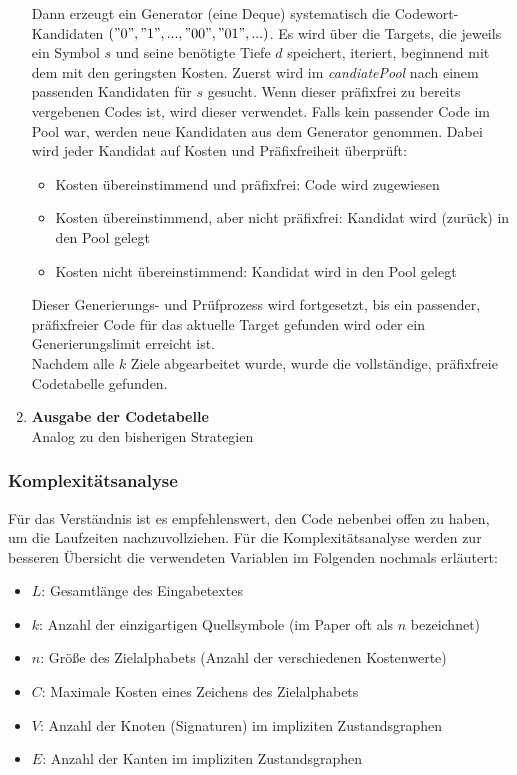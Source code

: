 \documentclass[a4paper,10pt,ngerman]{scrartcl}
\begin{document}
\begin{enumerate}
  Dann erzeugt ein Generator (eine Deque) systematisch die Codewort-Kandidaten $("0", "1", ..., "00",\\ "01", ...)$. Es wird über die Targets, die jeweils ein Symbol $s$ und seine benötigte Tiefe $d$ speichert, iteriert, beginnend mit dem mit den geringsten Kosten. Zuerst wird im \textit{candiatePool} nach einem passenden Kandidaten für $s$ gesucht. Wenn dieser präfixfrei zu bereits vergebenen Codes ist, wird dieser verwendet. Falls kein passender Code im Pool war, werden neue Kandidaten aus dem Generator genommen. Dabei wird jeder Kandidat auf Kosten und Präfixfreiheit überprüft: 
  \begin{itemize}
    \item Kosten übereinstimmend und präfixfrei: Code wird zugewiesen 
    \item Kosten übereinstimmend, aber nicht präfixfrei: Kandidat wird (zurück) in den Pool gelegt 
    \item Kosten nicht übereinstimmend: Kandidat wird in den Pool gelegt 
  \end{itemize}
  Dieser Generierungs- und Prüfprozess wird fortgesetzt, bis ein passender, präfixfreier Code für das aktuelle Target gefunden wird oder ein Generierungslimit erreicht ist. 
  \\\newline
  Nachdem alle $k$ Ziele abgearbeitet wurde, wurde die vollständige, präfixfreie Codetabelle gefunden. 
  \item \textbf{Ausgabe der Codetabelle} \\
  Analog zu den bisherigen Strategien
  
\end{enumerate}

\subsubsection{Komplexitätsanalyse}
Für das Verständnis ist es empfehlenswert, den Code nebenbei offen zu haben, um die Laufzeiten nachzuvollziehen. Für die Komplexitätsanalyse werden zur besseren Übersicht die verwendeten Variablen im Folgenden nochmals erläutert:
\begin{itemize}
  \item $L$: Gesamtlänge des Eingabetextes
  \item $k$: Anzahl der einzigartigen Quellsymbole (im Paper oft als $n$ bezeichnet)
  \item $n$: Größe des Zielalphabets (Anzahl der verschiedenen Kostenwerte)
  \item $C$: Maximale Kosten eines Zeichens des Zielalphabets
  \item $V$: Anzahl der Knoten (Signaturen) im impliziten Zustandsgraphen
  \item $E$: Anzahl der Kanten im impliziten Zustandsgraphen
\end{itemize}
\end{document}
